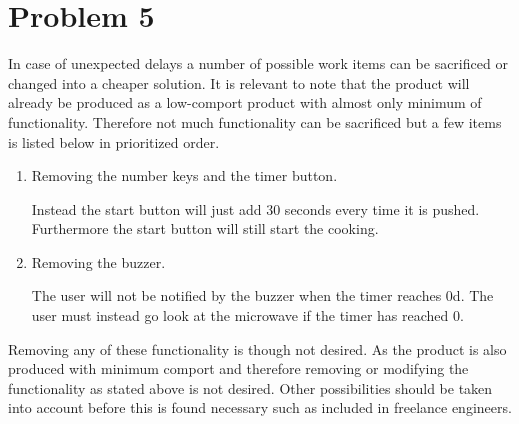 \chapter{Problem 5}

In case of unexpected delays a number of possible work items can be sacrificed or changed into a cheaper solution. It is relevant to note that the product will already be produced as a low-comport product with almost only minimum of functionality. Therefore not much functionality can be sacrificed but a few items is listed below in prioritized order. 

\begin{enumerate}
\item Removing the number keys and the timer button. 

Instead the start button will just add 30 seconds every time it is pushed. Furthermore the start button will still start the cooking.
	
\item Removing the buzzer. 

The user will not be notified by the buzzer when the timer reaches 0d. The user must instead go look at the microwave if the timer has reached 0.

\end{enumerate}

Removing any of these functionality is though not desired. As the product is also produced with minimum comport and therefore removing or modifying the functionality as stated above is not desired. Other possibilities should be taken into account before this is found necessary such as included in freelance engineers.



